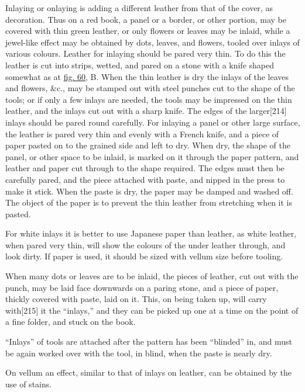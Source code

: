 \documentclass[
]{article}
\begin{document}
Inlaying or onlaying is adding a different leather from that of the
cover, as decoration. Thus on a red book, a panel or a border, or other
portion, may be covered with thin green leather, or only flowers or
leaves may be inlaid, while a jewel-like effect may be obtained by dots,
leaves, and flowers, tooled over inlays of various colours. Leather for
inlaying should be pared very thin. To do this the leather is cut into
strips, wetted, and pared on a stone with a knife shaped somewhat as at
\protect\hyperlink{Fig_60}{fig. 60}, B. When the thin leather is dry the
inlays of the leaves and flowers, \&c., may be stamped out with steel
punches cut to the shape of the tools; or if only a few inlays are
needed, the tools may be impressed on the thin leather, and the inlays
cut out with a sharp knife. The edges of the
larger{\protect\hypertarget{Page_214}{}{{[}214{]}}} inlays should be
pared round carefully. For inlaying a panel or other large surface, the
leather is pared very thin and evenly with a French knife, and a piece
of paper pasted on to the grained side and left to dry. When dry, the
shape of the panel, or other space to be inlaid, is marked on it through
the paper pattern, and leather and paper cut through to the shape
required. The edges must then be carefully pared, and the piece attached
with paste, and nipped in the press to make it stick. When the paste is
dry, the paper may be damped and washed off. The object of the paper is
to prevent the thin leather from stretching when it is pasted.

For white inlays it is better to use Japanese paper than leather, as
white leather, when pared very thin, will show the colours of the under
leather through, and look dirty. If paper is used, it should be sized
with vellum size before tooling.

When many dots or leaves are to be inlaid, the pieces of leather, cut
out with the punch, may be laid face downwards on a paring stone, and a
piece of paper, thickly covered with paste, laid on it. This, on being
taken up, will carry with{\protect\hypertarget{Page_215}{}{{[}215{]}}}
it the ``inlays,'' and they can be picked up one at a time on the point
of a fine folder, and stuck on the book.

``Inlays'' of tools are attached after the pattern has been ``blinded''
in, and must be again worked over with the tool, in blind, when the
paste is nearly dry.

On vellum an effect, similar to that of inlays on leather, can be
obtained by the use of stains.
\end{document}
